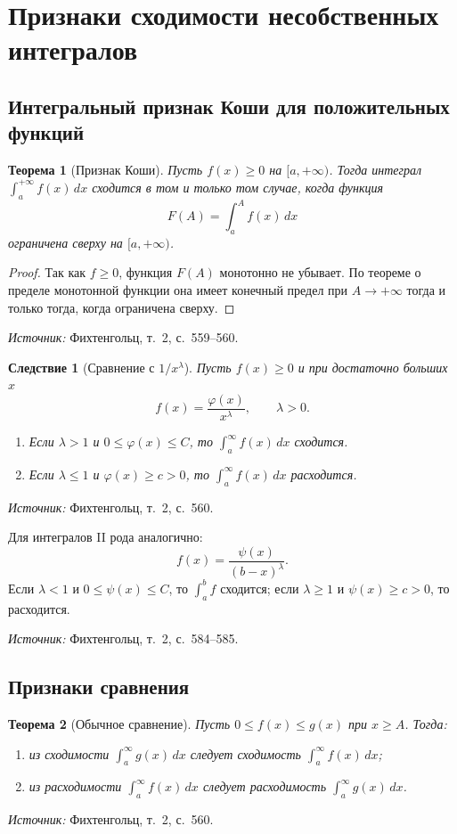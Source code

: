 \documentclass[12pt,a4paper]{article}
\newcommand{\source}[1]{\par\noindent\textit{Источник:} #1.}
\theoremstyle{definition}
\theoremstyle{plain}
\newtheorem{theorem}{Теорема}[section]
\newtheorem{corollary}{Следствие}[section]
\theoremstyle{remark}
\begin{document}
\section{Признаки сходимости несобственных интегралов}

\subsection{Интегральный признак Коши для положительных функций}

\begin{theorem}[Признак Коши]
Пусть \(f(x)\ge0\) на \([a,+\infty)\). Тогда интеграл \(\int_a^{+\infty}f(x)\,dx\) сходится в том и только том случае, когда функция
\[
F(A)=\int_a^A f(x)\,dx
\]
ограничена сверху на \([a,+\infty)\).
\end{theorem}

\begin{proof}
Так как \(f\ge0\), функция \(F(A)\) монотонно не убывает. По теореме о пределе монотонной функции она имеет конечный предел при \(A\to+\infty\) тогда и только тогда, когда ограничена сверху.
\end{proof}
\source{Фихтенгольц, т.~2, с.~559--560}

\begin{corollary}[Сравнение с \(1/x^\lambda\)]
Пусть \(f(x)\ge0\) и при достаточно больших \(x\)
\[
f(x)=\frac{\varphi(x)}{x^\lambda},\qquad \lambda>0.
\]
\begin{enumerate}
\item Если \(\lambda>1\) и \(0\le\varphi(x)\le C\), то \(\int_a^\infty f(x)\,dx\) сходится.
\item Если \(\lambda\le1\) и \(\varphi(x)\ge c>0\), то \(\int_a^\infty f(x)\,dx\) расходится.
\end{enumerate}
\end{corollary}
\source{Фихтенгольц, т.~2, с.~560}

Для интегралов II рода аналогично:
\[
f(x)=\frac{\psi(x)}{(b-x)^\lambda}.
\]
Если \(\lambda<1\) и \(0\le\psi(x)\le C\), то \(\int_a^b f\) сходится; если \(\lambda\ge1\) и \(\psi(x)\ge c>0\), то расходится.
\source{Фихтенгольц, т.~2, с.~584--585}

\subsection{Признаки сравнения}

\begin{theorem}[Обычное сравнение]
Пусть \(0\le f(x)\le g(x)\) при \(x\ge A\). Тогда:
\begin{enumerate}
\item из сходимости \(\int_a^\infty g(x)\,dx\) следует сходимость \(\int_a^\infty f(x)\,dx\);
\item из расходимости \(\int_a^\infty f(x)\,dx\) следует расходимость \(\int_a^\infty g(x)\,dx\).
\end{enumerate}
\end{theorem}
\source{Фихтенгольц, т.~2, с.~560}
\end{document}
